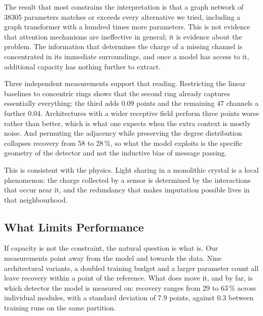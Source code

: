\documentclass[10pt,conference]{IEEEtran}
\begin{document}
The result that most constrains the interpretation is that a graph network of
\num{38305} parameters matches or exceeds every alternative we tried, including
a graph transformer with a hundred times more parameters. This is not evidence
that attention mechanisms are ineffective in general; it is evidence about the
problem. The information that determines the charge of a missing channel is
concentrated in its immediate surroundings, and once a model has access to it,
additional capacity has nothing further to extract.

Three independent measurements support that reading. Restricting the linear
baselines to concentric rings shows that the second ring already captures
essentially everything: the third adds 0.09 points and the remaining 47
channels a further 0.04. Architectures with a wider receptive field perform
three points worse rather than better, which is what one expects when the extra
context is mostly noise. And permuting the adjacency while preserving the
degree distribution collapses recovery from 58 to 28\,\%, so what the model
exploits is the specific geometry of the detector and not the inductive bias of
message passing.

This is consistent with the physics. Light sharing in a monolithic crystal is a
local phenomenon: the charge collected by a sensor is determined by the
interactions that occur near it, and the redundancy that makes imputation
possible lives in that neighbourhood.

\subsection{What Limits Performance}
\label{sec:disc-limits}

If capacity is not the constraint, the natural question is what is. Our
measurements point away from the model and towards the data. Nine architectural
variants, a doubled training budget and a larger parameter count all leave
recovery within a point of the reference. What does move it, and by far, is
which detector the model is measured on: recovery ranges from 29 to 63\,\%
across individual modules, with a standard deviation of 7.9 points, against 0.3
between training runs on the same partition.
\end{document}
